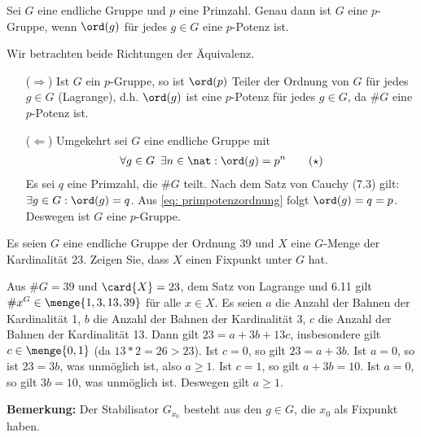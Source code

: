 \begin{uebungsblatt}
%
\begin{uebung}[Präsenz]
	Sei $G$ eine endliche Gruppe und $p$ eine Primzahl. Genau dann ist $G$ eine $p$-Gruppe, wenn $\ord(g)$ für jedes $g \in G$ eine $p$-Potenz ist.
\end{uebung}
\begin{loesung}
	Wir betrachten beide Richtungen der Äquivalenz.
	\begin{itemize}
		\item[($\Rightarrow$)] Ist $G$ ein $p$-Gruppe, so ist $\ord(p)$ Teiler der Ordnung von $G$ für jedes $g \in G$ (Lagrange), d.h. $\ord(g)$ ist eine $p$-Potenz für jedes $g \in G$, da $\# G$ eine $p$-Potenz ist.
		\item [($\Leftarrow$)] Umgekehrt sei $G$ eine endliche Gruppe mit 
		\begin{align} \label{eq: primpotenzordnung}
			\forall g \in G \enspace \exists n \in \nat: \ord(g) = p^n \tag{$\star$}
		\end{align}
		Es sei $q$ eine Primzahl, die $\# G$ teilt. Nach dem Satz von Cauchy (7.3) gilt: $\exists g \in G : \ord(g) = q$. Aus \cref{eq: primpotenzordnung} folgt $\ord(g) = q = p$. Deswegen ist $G$ eine $p$-Gruppe.
	\end{itemize}
\end{loesung}
%
\begin{uebung}[Präsenz]
	Es seien $G$ eine endliche Gruppe der Ordnung 39 und $X$ eine $G$-Menge der Kardinalität 23. Zeigen Sie, dass $X$ einen Fixpunkt unter $G$ hat.
\end{uebung}
\begin{loesung}
	Aus $\#G =39$ und $\card{X} = 23$, dem Satz von Lagrange und 6.11 gilt $\# x^G \in \menge{1,3,13,39}$ für alle $x \in X$. Es seien $a$ die Anzahl der Bahnen der Kardinalität 1, $b$ die Anzahl der Bahnen der Kardinalität 3, $c$ die Anzahl der Bahnen der Kardinalität 13. Dann gilt $23 = a + 3b + 13c$, insbesondere gilt $c \in \menge{0,1}$ (da $13*2 =26 > 23$). Ist $c=0$, so gilt $23=a+3b$. Ist $a=0$, so ist $23 = 3b$, was unmöglich ist, also $a \geq 1$. Ist $c=1$, so gilt $a+3b=10$. Ist $a=0$, so gilt $3b=10$, was unmöglich ist. Deswegen gilt $a \geq 1$.
\end{loesung}

\textbf{Bemerkung:} Der Stabilisator $G_{x_0}$ besteht aus den $g \in G$, die $x_0$ als Fixpunkt haben.

\end{uebungsblatt}